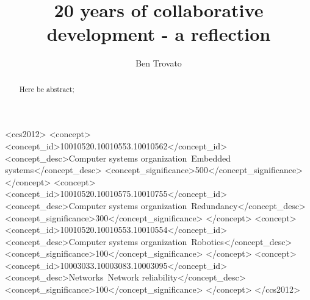 \documentclass[sigchi,anonymous,review]{acmart}
\begin{document}
\title{20 years of collaborative development - a reflection}


\author{Ben Trovato}

\renewcommand{\shortauthors}{B. Trovato et al.}

\begin{abstract}
Here be abstract;
\end{abstract}

%
%
\begin{CCSXML}
<ccs2012>
 <concept>
  <concept_id>10010520.10010553.10010562</concept_id>
  <concept_desc>Computer systems organization~Embedded systems</concept_desc>
  <concept_significance>500</concept_significance>
 </concept>
 <concept>
  <concept_id>10010520.10010575.10010755</concept_id>
  <concept_desc>Computer systems organization~Redundancy</concept_desc>
  <concept_significance>300</concept_significance>
 </concept>
 <concept>
  <concept_id>10010520.10010553.10010554</concept_id>
  <concept_desc>Computer systems organization~Robotics</concept_desc>
  <concept_significance>100</concept_significance>
 </concept>
 <concept>
  <concept_id>10003033.10003083.10003095</concept_id>
  <concept_desc>Networks~Network reliability</concept_desc>
  <concept_significance>100</concept_significance>
 </concept>
</ccs2012>  
\end{CCSXML}




\maketitle









 
\end{document}
